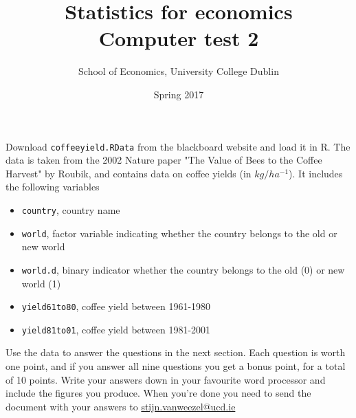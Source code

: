 \documentclass{tufte-handout}
\title{Statistics for economics \\ Computer test 2}
\author{School of Economics, University College Dublin}
\date{Spring 2017}
\begin{document}
\maketitle  

\vspace{.5cm}
Download \texttt{coffeeyield.RData} from the blackboard website and load it in R. 
The data is taken from the 2002 Nature paper "The Value of Bees to the Coffee Harvest" by Roubik, and contains data on coffee yields (in $kg/ha^{-1}$). 
It includes the following variables
\begin{itemize}
  \item \texttt{country}, country name
  \item \texttt{world}, factor variable indicating whether the country belongs to the old or new world
  \item \texttt{world.d}, binary indicator whether the country belongs to the old (0) or new world (1)
  \item \texttt{yield61to80}, coffee yield between 1961-1980
  \item \texttt{yield81to01}, coffee yield between 1981-2001
\end{itemize}

Use the data to answer the questions in the next section. 
Each question is worth one point, and if you answer all nine questions you get a bonus point, for a total of 10 points. 
Write your answers down in your favourite word processor and include the figures you produce. 
When you're done you need to send the document with your answers to \href{stijn.vanweezel@ucd.ie}{stijn.vanweezel@ucd.ie}

\clearpage
\end{document}
